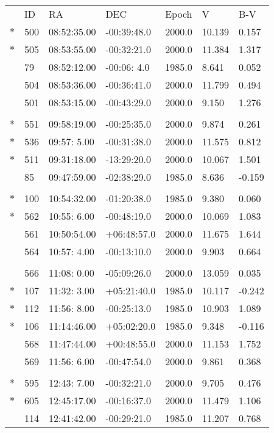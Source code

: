 \documentclass[10pt]{report}
\renewcommand{\[}{\begin{eqnarray}}
\renewcommand{\]}{\end{eqnarray}}
\begin{document}
\begin{tabular}{lllllll}
 &  ID&    RA    &      DEC  &  Epoch&     V  &     B-V    \\
$\ast$&500&08:52:35.00&-00:39:48.0&2000.0 & 10.139 &  0.157 \\
$\ast$&505&08:53:55.00&-00:32:21.0&2000.0 & 11.384 &  1.317 \\
 & 79&08:52:12.00&-00:06: 4.0&1985.0 &  8.641 &  0.052 \\
 &504&08:53:36.00&-00:36:41.0&2000.0 & 11.799 &  0.494 \\
 &501&08:53:15.00&-00:43:29.0&2000.0 &  9.150 &  1.276 \\
\multicolumn{7}{l}{ }\\
$\ast$&551&09:58:19.00&-00:25:35.0&2000.0 &  9.874 &  0.261 \\
$\ast$&536&09:57: 5.00&-00:31:38.0&2000.0 & 11.575 &  0.812 \\
$\ast$&511&09:31:18.00&-13:29:20.0&2000.0 & 10.067 &  1.501 \\
 & 85&09:47:59.00&-02:38:29.0&1985.0 &  8.636 & -0.159 \\
\multicolumn{7}{l}{ }\\
$\ast$&100&10:54:32.00&-01:20:38.0&1985.0 &  9.380 &  0.060 \\
$\ast$&562&10:55: 6.00&-00:48:19.0&2000.0 & 10.069 &  1.083 \\
 &561&10:50:54.00&+06:48:57.0&2000.0 & 11.675 &  1.644 \\
 &564&10:57: 4.00&-00:13:10.0&2000.0 &  9.903 &  0.664 \\
\multicolumn{7}{l}{ }\\
 &566&11:08: 0.00&-05:09:26.0&2000.0 & 13.059 &  0.035 \\
$\ast$&107&11:32: 3.00&+05:21:40.0&1985.0 & 10.117 & -0.242 \\
$\ast$&112&11:56: 8.00&-00:25:13.0&1985.0 & 10.903 &  1.089 \\
$\ast$&106&11:14:46.00&+05:02:20.0&1985.0 &  9.348 & -0.116 \\
 &568&11:47:44.00&+00:48:55.0&2000.0 & 11.153 &  1.752 \\
 &569&11:56: 6.00&-00:47:54.0&2000.0 &  9.861 &  0.368 \\
\multicolumn{7}{l}{ }\\
$\ast$&595&12:43: 7.00&-00:32:21.0&2000.0 &  9.705 &  0.476 \\
$\ast$&605&12:45:17.00&-00:16:37.0&2000.0 & 11.479 &  1.106 \\
 &114&12:41:42.00&-00:29:21.0&1985.0 & 11.207 &  0.768 \\

\end{tabular}
\end{document}
